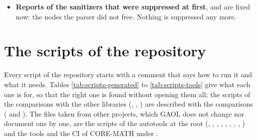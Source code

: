 \begin{itemize}
  of two zeros of different signs gave $+0$ and $-0$ with Visual C++ in
  Release, rather than $-0$ and $+0$, which the unit test
   checks, built with Visual C++ since the tests of
   are in . A shared  built by
   or meson did not export the classes and functions of the
  expressions, and a program building one did not link with it: the shared
  library jobs of the three builds, whose tests link with ,
  build ; the tests that  links with
  the installed one no longer include it, the headers of the expressions not
  being installed. GCC 9.3 and 10.2 for 64-bit ARM (Debian 11 has GCC 10.2)
  stopped with an internal compiler error on three sources of GAOL once the
  NEON intervals were the default: for the combination of a constant other
  than $+0$ and a variable, as in , they put into the
  constant pool the constant with an integer 0 as its other half (GCC bugs
  99037 and 100441, fixed in GCC 9.4 and 10.3). The two lanes are
  now set with , which gives the same instructions
  with Clang 18 and 21, and with GCC 12.2 for two variables, and a job
  builds and tests GAOL on Debian 11 arm64.
\item[$\bullet$] \textbf{Reports of the sanitizers that were suppressed at
  first}, and are fixed now: the nodes the parser did not free. Nothing is
  suppressed any more.
\end{itemize}

\section{The scripts of the repository}\label{sec:scripts}
%

Every script of the repository starts with a comment that says how to run it
and what it needs. Tables \ref{tab:scripts-generated} to
\ref{tab:scripts-tools} give what each one is for, so that the right one is
found without opening them all; the scripts of the comparisons with the
other libraries (, ,
) are described with the comparisons
( and ). The files taken from
other projects, which GAOL does not change nor document one by one, are the
scripts of the autotools at the root (,
, , , ,
, , , )
and the tools and the CI of CORE-MATH under .

